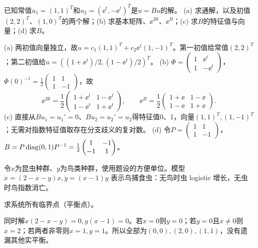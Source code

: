 \begin{exercise}\label{cw:rec24-3}
已知常值$u_1=(1,1)^T$和$u_2=(\ee^t,-\ee^t)^T$是$\dot u=Bu$的解。
(a) 求通解，以及初值$(2,2)^T$、$(1,0)^T$的两个解；(b) 求基本矩阵、$\ee^{Bt}$、$\ee^B$；(c) 求$B$的特征值与向量；(d) 求$B$。
\end{exercise}
\begin{solution}
(a) 两初值向量独立，故$u=c_1(1,1)^T+c_2\ee^t(1,-1)^T$。第一初值给常值$(2,2)^T$；第二初值给$u=((1+\ee^t)/2,(1-\ee^t)/2)^T$。
(b) $\Phi=\begin{pmatrix}1&\ee^t\\1&-\ee^t\end{pmatrix}$，$\Phi(0)^{-1}=\frac12\begin{pmatrix}1&1\\1&-1\end{pmatrix}$，故
\[\ee^{Bt}=\frac12\begin{pmatrix}1+\ee^t&1-\ee^t\\1-\ee^t&1+\ee^t\end{pmatrix},\qquad\ee^B=\frac12\begin{pmatrix}1+\ee&1-\ee\\1-\ee&1+\ee\end{pmatrix}.\]
(c) 直接从$Bu_1=u_1'=0$、$Bu_2=u_2'=u_2$得特征值0、1，向量$(1,1)^T,(1,-1)^T$；无需对指数特征值取存在分支歧义的复对数。
(d) 令$P=\begin{pmatrix}1&1\\1&-1\end{pmatrix}$，$B=P\operatorname{diag}(0,1)P^{-1}=\frac12\begin{pmatrix}1&-1\\-1&1\end{pmatrix}$。
\par{}
\end{solution}

令$x$为昆虫种群、$y$为鸟类种群，使用题设的方便单位。模型 $\dot x=(2-x-y)x,\dot y=(x-1)y$ 表示鸟捕食虫：无鸟时虫 logistic 增长，无虫时鸟指数消亡。
\begin{exercise}\label{cw:rec25-1}
求系统所有临界点（平衡点）。
\end{exercise}
\begin{solution}
同时解$x(2-x-y)=0,y(x-1)=0$。若$x=0$则$y=0$；若$y=0$且$x\ne0$则$x=2$；若两者非零则$x=1,y=1$。所以全部为$(0,0),(2,0),(1,1)$，没有遗漏其他实平衡。
\par{}
\end{solution}

